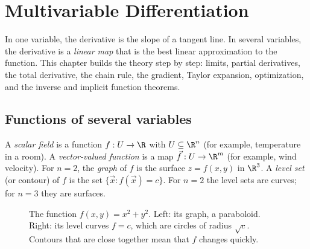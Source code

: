 \chapter{Multivariable Differentiation}
\label{ch:diff}

In one variable, the derivative is the slope of a tangent line. In several variables, the derivative is a \emph{linear map} that is the best linear approximation to the function. This chapter builds the theory step by step: limits, partial derivatives, the total derivative, the chain rule, the gradient, Taylor expansion, optimization, and the inverse and implicit function theorems.

\section{Functions of several variables}

A \emph{scalar field} is a function $f:U\to\R$ with $U\subseteq\R^n$ (for example, temperature in a room). A \emph{vector-valued function} is a map $\vec f:U\to\R^m$ (for example, wind velocity). For $n=2$, the \emph{graph} of $f$ is the surface $z=f(x,y)$ in $\R^3$. A \emph{level set} (or contour) of $f$ is the set $\{\vec x: f(\vec x)=c\}$. For $n=2$ the level sets are curves; for $n=3$ they are surfaces.

\begin{figure}[ht]
\centering
\begin{minipage}{0.48\textwidth}
\centering
{}
\end{minipage}
\begin{minipage}{0.48\textwidth}
\centering
{}
\end{minipage}
\caption{The function $f(x,y)=x^2+y^2$. Left: its graph, a paraboloid. Right: its level curves $f=c$, which are circles of radius $\sqrt c$. Contours that are close together mean that $f$ changes quickly.}
\label{fig:paraboloid}
\end{figure}

